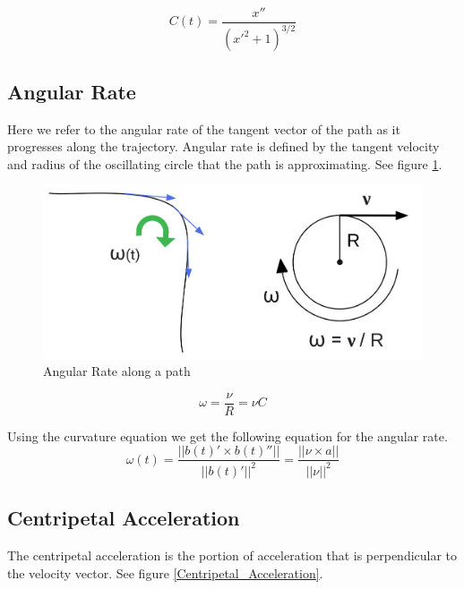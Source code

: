 \documentclass{article}
\begin{document}
\begin{equation}
    C(t) = \frac{x''}{(x'^2 + 1)^{3/2}} 
\end{equation}

\subsection{Angular Rate}

Here we refer to the angular rate of the tangent vector of the path as it progresses along the trajectory. Angular rate is defined by the tangent velocity and radius of the oscillating circle that the path is approximating. See figure \ref{Fig:AngularRate.png}.

\begin{figure}[H]
\centering
\includegraphics[scale=.12]{AngularRate.png}
\caption{Angular Rate along a path}
\label{Fig:AngularRate.png}
\end{figure}

\begin{equation}
    \omega = \frac{\nu}{R} = \nu C
\end{equation}

Using the curvature equation we get the following equation for the angular rate.
\begin{equation}
    \omega(t) = \frac{||b(t)' \times b(t)''||}{||b(t)'||^2} = \frac{||\nu \times a||}{||\nu||^2}
\end{equation}

\subsection{Centripetal Acceleration}

The centripetal acceleration is the portion of acceleration that is perpendicular to the velocity vector. See figure \ref{Centripetal_Acceleration}.
\end{document}
